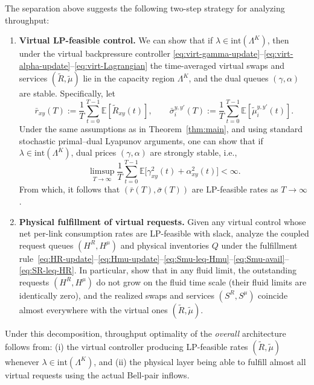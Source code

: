 \documentclass[11pt]{article}
\newcommand{\E}{\mathbb{E}}
\begin{document}
The separation above suggests the following two-step strategy for analyzing throughput:

\begin{enumerate}[leftmargin=2em,label=(\roman*)]
\item \textbf{Virtual LP-feasible control.}
We can show that if $\lambda\in\mathrm{int}(\Lambda^K)$, then under the virtual backpressure controller
\eqref{eq:virt-gamma-update}--\eqref{eq:virt-alpha-update}--\eqref{eq:virt-Lagrangian} the
time-averaged virtual swaps and services $(\tilde R,\tilde\mu)$ lie in the capacity region
$\Lambda^K$, and the dual queues $(\gamma,\alpha)$ are stable. Specifically, let
\[
\bar r_{xy}(T)
:= \frac{1}{T}\sum_{t=0}^{T-1} \E[\tilde R_{xy}(t)],
\qquad
\bar\sigma_i^{y,y'}(T)
:= \frac{1}{T}\sum_{t=0}^{T-1} \E[\tilde\mu_i^{y,y'}(t)].
\]
Under the same assumptions as in Theorem~\ref{thm:main}, and using standard
stochastic primal--dual Lyapunov arguments, one can show that if $\lambda\in\mathrm{int}(\Lambda^K)$, dual prices $(\gamma,\alpha)$ are strongly stable, i.e., 
\begin{equation}
\limsup_{T\to\infty}
\frac{1}{T}\sum_{t=0}^{T-1}
\E\!\big[\gamma_{xy}^2(t)+\alpha_{xy}^2(t)\big]
< \infty.
\label{eq:virt-dual-stability}
\end{equation}
From which, it follows that $(\bar r(T), \bar \sigma (T))$ are LP-feasible rates as $T \to \infty$. 

\item \textbf{Physical fulfillment of virtual requests.}
Given any virtual control whose net per-link consumption rates are LP-feasible with slack,
analyze the coupled request queues $(H^R,H^\mu)$ and physical inventories $Q$ under the
fulfillment rule~\eqref{eq:HR-update}--\eqref{eq:Hmu-update}--\eqref{eq:Smu-leq-Hmu}--\eqref{eq:Smu-avail}--\eqref{eq:SR-leq-HR}.
In particular, show that in any fluid limit, the outstanding requests $(H^R,H^\mu)$ do not
grow on the fluid time scale (their fluid limits are identically zero), and the realized
swaps and services $(S^R,S^\mu)$ coincide almost everywhere with the virtual ones
$(\tilde R,\tilde\mu)$.

\end{enumerate}

Under this decomposition, throughput optimality of the \emph{overall} architecture follows
from:
(i) the virtual controller producing LP-feasible rates $(\tilde R,\tilde\mu)$ whenever
$\lambda\in\mathrm{int}(\Lambda^K)$, and
(ii) the physical layer being able to fulfill almost all virtual requests using the actual
Bell-pair inflows.
\end{document}
